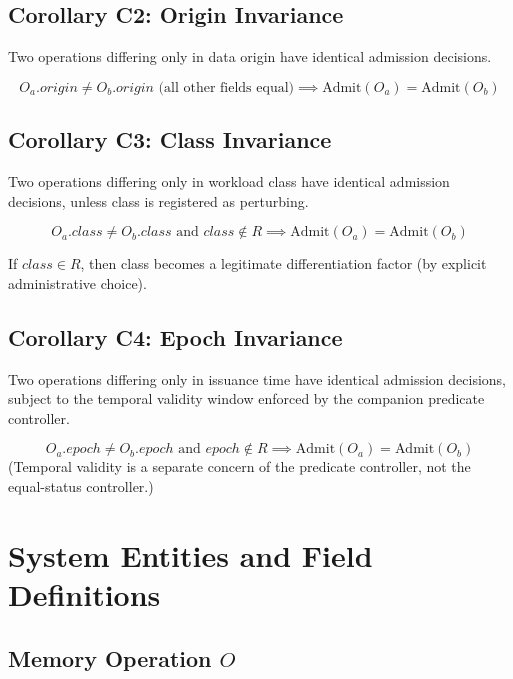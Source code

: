 \documentclass[11pt,oneside]{article}
\begin{document}
\subsection{Corollary C2: Origin Invariance}

\begin{boxed}
Two operations differing only in data origin have identical admission decisions.

\[
O_a.origin \neq O_b.origin \text{ (all other fields equal)} \implies \text{Admit}(O_a) = \text{Admit}(O_b)
\]
\end{boxed}

\subsection{Corollary C3: Class Invariance}

\begin{boxed}
Two operations differing only in workload class have identical admission decisions, unless class is registered as perturbing.

\[
O_a.class \neq O_b.class \text{ and } class \notin R \implies \text{Admit}(O_a) = \text{Admit}(O_b)
\]
\end{boxed}

If $class \in R$, then class becomes a legitimate differentiation factor (by explicit administrative choice).

\subsection{Corollary C4: Epoch Invariance}

\begin{boxed}
Two operations differing only in issuance time have identical admission decisions, subject to the temporal validity window enforced by the companion predicate controller.

\[
O_a.epoch \neq O_b.epoch \text{ and } epoch \notin R \implies \text{Admit}(O_a) = \text{Admit}(O_b)
\]
(Temporal validity is a separate concern of the predicate controller, not the equal-status controller.)
\end{boxed}

\section{System Entities and Field Definitions}

\subsection{Memory Operation $O$}
\end{document}
